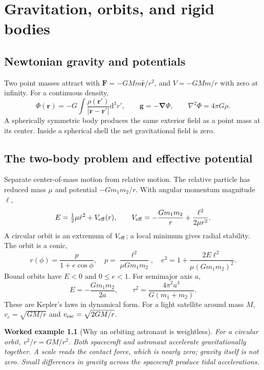 \documentclass[11pt,oneside]{book}
\newcommand{\dd}{\mathrm{d}}
\newcommand{\vect}[1]{\boldsymbol{#1}}
\newcommand{\grad}{\boldsymbol{\nabla}}
\newcommand{\lap}{\nabla^2}
\theoremstyle{reviewstyle}
\newtheorem{example}{Worked example}[chapter]
\begin{document}
\chapter{Gravitation, orbits, and rigid bodies}
\section{Newtonian gravity and potentials}
Two point masses attract with $\vect F=-GMm\hat{\vect r}/r^2$, and $V=-GMm/r$ with zero at infinity. For a continuous density,
\begin{equation}
\Phi(\vect r)=-G\int\frac{\rho(\vect r')}{|\vect r-\vect r'|}\dd^3r',
\qquad \vect g=-\grad\Phi,\qquad \lap\Phi=4\pi G\rho.
\end{equation}
A spherically symmetric body produces the same exterior field as a point mass at its center. Inside a spherical shell the net gravitational field is zero.
\section{The two-body problem and effective potential}
Separate center-of-mass motion from relative motion. The relative particle has reduced mass $\mu$ and potential $-Gm_1m_2/r$. With angular momentum magnitude $\ell$,
\begin{equation}
E=\tfrac12\mu\dot r^2+V_{\rm eff}(r),\qquad
V_{\rm eff}=-\frac{Gm_1m_2}{r}+\frac{\ell^2}{2\mu r^2}.
\end{equation}
A circular orbit is an extremum of $V_{\rm eff}$; a local minimum gives radial stability. The orbit is a conic,
\begin{equation}
r(\phi)=\frac{p}{1+e\cos\phi},\quad
p=\frac{\ell^2}{\mu Gm_1m_2},\quad
e^2=1+\frac{2E\ell^2}{\mu(Gm_1m_2)^2}.
\end{equation}
Bound orbits have $E<0$ and $0\leq e<1$. For semimajor axis $a$,
\begin{equation}
E=-\frac{Gm_1m_2}{2a},\qquad
\tau^2=\frac{4\pi^2a^3}{G(m_1+m_2)}.
\end{equation}
These are Kepler's laws in dynamical form. For a light satellite around mass $M$,
$v_c=\sqrt{GM/r}$ and $v_{\rm esc}=\sqrt{2GM/r}$.
\begin{example}[Why an orbiting astronaut is weightless]
For a circular orbit, $v^2/r=GM/r^2$. Both spacecraft and astronaut accelerate gravitationally together. A scale reads the contact force, which is nearly zero; gravity itself is not zero. Small differences in gravity across the spacecraft produce tidal accelerations.
\end{example}
\end{document}
